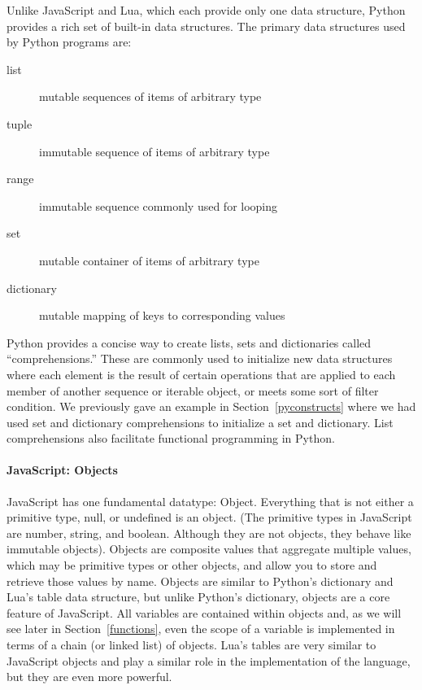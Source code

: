 Unlike JavaScript and Lua, which each provide only one data structure, Python
provides a rich set of built-in data structures. The primary data structures
used by Python programs are:

\begin{description}
 \item[list] mutable sequences of items of arbitrary type
 \item[tuple] immutable sequence of items of arbitrary type
 \item[range] immutable sequence commonly used for looping
 \item[set] mutable container of items of arbitrary type
 \item[dictionary] mutable mapping of keys to corresponding values
\end{description}

Python provides a concise way to create lists, sets and dictionaries called
``comprehensions.'' These are commonly used to initialize new data structures
where each element is the result of certain operations that are applied to each member of another sequence or iterable object, or meets some sort of filter condition. We previously gave an example in Section~\ref{pyconstructs} where we had used set and dictionary comprehensions to initialize a set and dictionary.
List comprehensions also facilitate functional programming in Python.

\paragraph{JavaScript: Objects}

JavaScript has one fundamental datatype: Object. Everything that is not either a
primitive type, null, or undefined is an object. (The primitive types in JavaScript are number, string, and boolean. Although they are not objects, they behave like immutable objects). Objects are composite values that aggregate multiple values, which may be
primitive types or other objects, and allow you to store and retrieve those values
by name. Objects are similar to Python's dictionary and Lua's table data structure, but
unlike Python's dictionary, objects are a core feature of JavaScript. All variables are
contained within objects and, as we will see later in Section~\ref{functions}, even
the scope of a variable is implemented in terms of a chain (or linked list) of objects.
Lua's tables are very similar to JavaScript objects and play a similar role in the
implementation of the language, but they are even more powerful.

